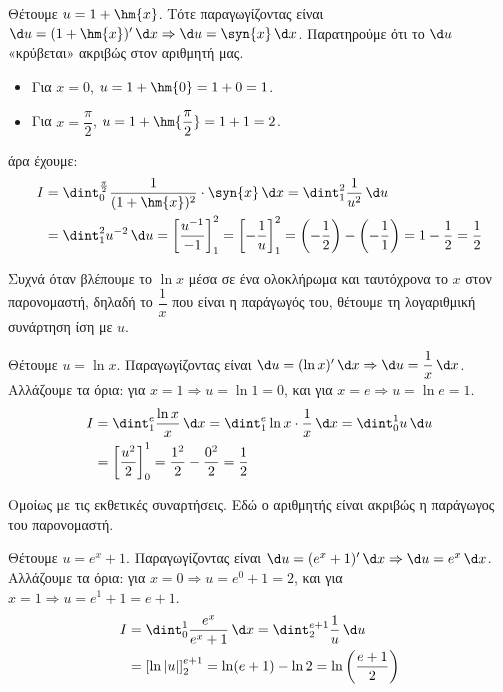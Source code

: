 Θέτουμε $u = 1 + \hm{x}$.
Τότε παραγωγίζοντας είναι $\d u = (1+\hm{x})' \, \d x \Rightarrow \d u = \syn{x} \, \d x$. Παρατηρούμε ότι το $\d u$ «κρύβεται» ακριβώς στον αριθμητή μας.
\begin{itemize}
\item Για $x = 0$, $u = 1 + \hm{0} = 1 + 0 = 1$.
\item Για $x = \dfrac{\pi}{2}$, $u = 1 + \hm{\dfrac{\pi}{2}} = 1 + 1 = 2$.
\end{itemize}
άρα έχουμε:
\begin{align*}
I &= \dint_0^{\frac{\pi}{2}} \frac{1}{(1+\hm{x})^2} \cdot \syn{x} \, \d x = \dint_1^2 \frac{1}{u^2} \, \d u \\
&= \dint_1^2 u^{-2} \, \d u = \left[ \frac{u^{-1}}{-1} \right]_1^2 = \left[ -\frac{1}{u} \right]_1^2 = \left( -\frac{1}{2} \right) - \left( -\frac{1}{1} \right) = 1 - \frac{1}{2} = \frac{1}{2}
\end{align*}

\lysh\vspace{-5mm}
\begin{alist}
\item Συχνά όταν βλέπουμε το $\ln{x}$ μέσα σε ένα ολοκλήρωμα και ταυτόχρονα το $x$ στον παρονομαστή, δηλαδή το $\dfrac{1}{x}$ που είναι η παράγωγός του, θέτουμε τη λογαριθμική συνάρτηση ίση με $u$.

Θέτουμε $u = \ln{x}$. Παραγωγίζοντας είναι $\d u = (\ln{x})' \, \d x \Rightarrow \d u = \dfrac{1}{x} \, \d x$.\\
Αλλάζουμε τα όρια: για $x=1 \Rightarrow u=\ln{1}=0$, και για $x=e \Rightarrow u=\ln{e}=1$.
\begin{align*}
I &= \dint_1^e \frac{\ln{x}}{x} \, \d x = \dint_1^e \ln{x} \cdot \frac{1}{x} \, \d x = \dint_0^1 u \, \d u \\
&= \left[ \frac{u^2}{2} \right]_0^1 = \frac{1^2}{2} - \frac{0^2}{2} = \frac{1}{2}
\end{align*}

\item 
Ομοίως με τις εκθετικές συναρτήσεις. Εδώ ο αριθμητής είναι ακριβώς η παράγωγος του παρονομαστή.

Θέτουμε $u = e^x + 1$. Παραγωγίζοντας είναι $\d u = (e^x + 1)' \, \d x \Rightarrow \d u = e^x \, \d x$.\\
Αλλάζουμε τα όρια: για $x=0 \Rightarrow u=e^0 + 1 = 2$, και για $x=1 \Rightarrow u=e^1 + 1 = e+1$.
\begin{align*}
I &= \dint_0^1 \frac{e^x}{e^x + 1} \, \d x = \dint_2^{e+1} \frac{1}{u} \, \d u \\
&= \left[ \ln|u| \right]_2^{e+1} = \ln(e+1) - \ln{2} = \ln\left(\frac{e+1}{2}\right)
\end{align*}
\end{alist}
